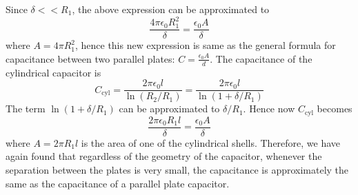 \documentclass{article}
\begin{document}
Since $\delta<<R_1$, the above expression can be approximated to
\[\frac{4\pi\epsilon_0R_1^2}{\delta}=\frac{\epsilon_0A}{\delta}\]
where $A=4\pi R_1^2$, hence this new expression is same as the general formula for capacitance between two parallel plates: $C=\frac{\epsilon_0A}{d}$.
The capacitance of the cylindrical capacitor is
\[C_{\text{cyl}}=\frac{2\pi\epsilon_0l}{\ln(R_2/R_1)}=\frac{2\pi\epsilon_0l}{\ln\left(1+\delta/R_1\right)}\]
The term $\ln(1+\delta/R_1)$ can be approximated to $\delta/R_1$. Hence now $C_{\text{cyl}}$ becomes
\[\frac{2\pi\epsilon_0R_1l}{\delta}=\frac{\epsilon_0A}{\delta}\]
where $A=2\pi R_1l$ is the area of one of the cylindrical shells. Therefore, we have again found that regardless of the geometry of the capacitor, whenever the separation between the plates is very small, the capacitance is approximately the same as the capacitance of a parallel plate capacitor.
\end{document}
